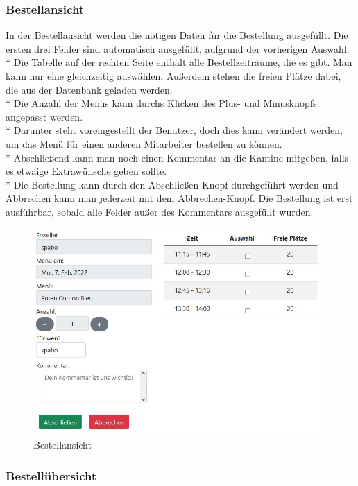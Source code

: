 \subsubsection {Bestellansicht}

In der Bestellansicht werden die nötigen Daten für die Bestellung ausgefüllt. Die ersten drei Felder sind automatisch ausgefüllt, aufgrund der vorherigen Auswahl. \\*
Die Tabelle auf der rechten Seite enthält alle Bestellzeiträume, die es gibt. Man kann nur eine gleichzeitig auswählen. Außerdem stehen die freien Plätze dabei, die aus der Datenbank geladen werden.\\*
Die Anzahl der Menüs kann durchs Klicken des Plus- und Minusknopfs angepasst werden.  \\*
Darunter steht voreingestellt der Benutzer, doch dies kann verändert werden, um das Menü für einen anderen Mitarbeiter bestellen zu können. \\*
Abschließend kann man noch einen Kommentar an die Kantine mitgeben, falls es etwaige Extrawünsche geben sollte. \\*
Die Bestellung kann durch den Abschließen-Knopf durchgeführt werden und Abbrechen kann man jederzeit mit dem Abbrechen-Knopf.
Die Bestellung ist erst ausführbar, sobald alle Felder außer des Kommentars ausgefüllt wurden.
\begin{figure}[htp]
    \centering
    \includegraphics[scale=0.7]{pics/mitarbeiter-bestellen.JPG}
    \caption{Bestellansicht}
    \label{fig:impl:BestellenMitarbeiter}
\end{figure}
\pagebreak

\subsubsection {Bestellübersicht}

